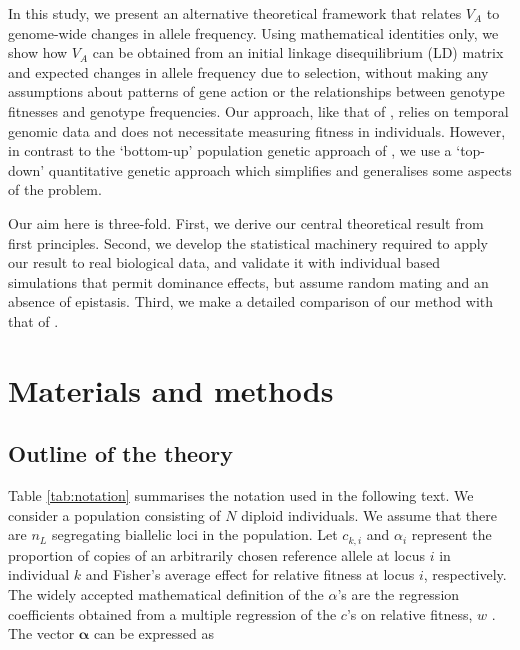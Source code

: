 \documentclass[12pt]{article}
\begin{document}
\begin{bibunit}
In this study, we present an alternative theoretical framework that relates $V_A$ to genome-wide changes in allele frequency. Using mathematical identities only, we show how $V_A$ can be obtained from an initial linkage disequilibrium (LD) matrix and expected changes in allele frequency due to selection, without making any assumptions about patterns of gene action or the relationships between genotype fitnesses and genotype frequencies. Our approach, like that of \citet{buffalo2019linked}, relies on temporal genomic data and does not necessitate measuring fitness in individuals. However, in contrast to the `bottom-up' population genetic approach of \citet{buffalo2019linked}, we use a `top-down' quantitative genetic approach which simplifies and generalises some aspects of the problem.

Our aim here is three-fold. First, we derive our central theoretical result from first principles. Second, we develop the statistical machinery required to apply our result to real biological data, and validate it with individual based simulations that permit dominance effects, but assume random mating and an absence of epistasis. Third, we make a detailed comparison of our method with that of \citet{buffalo2019linked}.

\section*{Materials and methods}

\subsection*{Outline of the theory}

Table \ref{tab:notation} summarises the notation used in the following text. We consider a population consisting of $N$ diploid individuals. We assume that there are $n_L$ segregating biallelic loci in the population. Let $c_{k,i}$ and $\alpha_i$ represent the proportion of copies of an arbitrarily chosen reference allele at locus $i$ in individual $k$ and Fisher's average effect \citep{Fisher.1941} for relative fitness at locus $i$, respectively. The widely accepted mathematical definition of the $\alpha$'s are the regression coefficients obtained from a multiple regression of the $c$'s on relative fitness, $w$ \citep{Fisher.1941, Lee.2013}. The vector $\boldsymbol{{\alpha}}$ can be expressed as


\end{bibunit}
\end{document}

